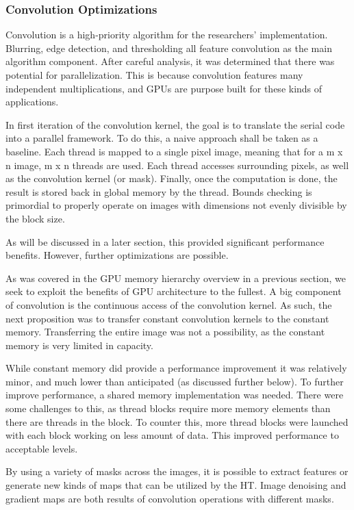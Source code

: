 \documentclass[conference]{IEEEtran}
\begin{document}
\subsubsection*{Convolution Optimizations}
Convolution is a high-priority algorithm for the researchers' implementation. Blurring, edge detection, and thresholding all feature convolution as the main algorithm component. After careful analysis, it was determined that there was potential  for parallelization. This is because convolution features many independent multiplications, and GPUs are purpose built for these kinds of applications.

In first iteration of the convolution kernel, the goal is to translate the serial code into a parallel framework. To do this, a naive approach shall be taken as a baseline. Each thread is mapped to a single pixel image, meaning that for a m x n image, m x n threads are used. Each thread accesses surrounding pixels, as well as the convolution kernel (or mask). Finally, once the computation is done, the result is stored back in global memory by the thread. Bounds checking is primordial to properly operate on images with dimensions not evenly divisible by the block size.

As will be discussed in a later section, this provided significant performance benefits. However, further optimizations are possible.

As was covered in the GPU memory hierarchy overview in a previous section, we seek to exploit the benefits of GPU architecture to the fullest. A big component of convolution is the continuous access of the convolution kernel. As such, the next proposition was to transfer constant convolution kernels to the constant memory. Transferring the entire image was not a possibility, as the constant memory is very limited in capacity.

While constant memory did provide a performance improvement it was relatively minor, and much lower than anticipated (as discussed further below). To further improve performance,  a shared memory implementation was needed. There were some challenges to this, as thread blocks require more memory elements than there are threads in the block. To counter this, more thread blocks were launched with each block working on less amount of data. This improved performance to acceptable levels.


By using a variety of masks across the images, it is possible to extract features or generate new kinds of maps that can be utilized by the HT\@.
Image denoising and gradient maps are both results of convolution operations with different masks.
\end{document}

